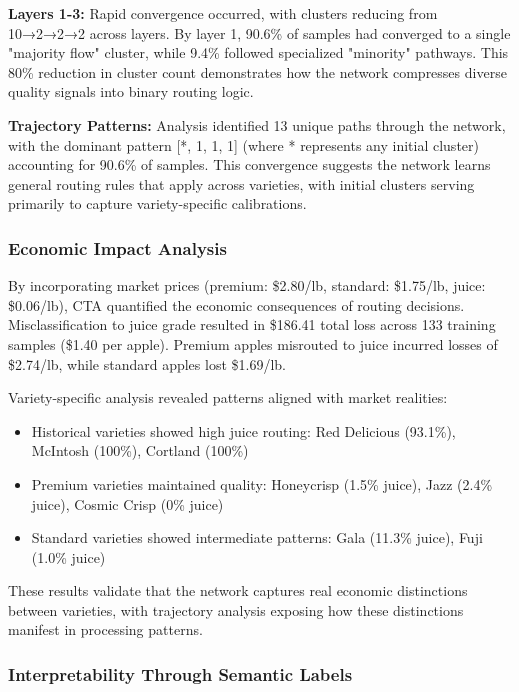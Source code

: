 \textbf{Layers 1-3:} Rapid convergence occurred, with clusters reducing from 10→2→2→2 across layers. By layer 1, 90.6\% of samples had converged to a single "majority flow" cluster, while 9.4\% followed specialized "minority" pathways. This 80\% reduction in cluster count demonstrates how the network compresses diverse quality signals into binary routing logic.

\textbf{Trajectory Patterns:} Analysis identified 13 unique paths through the network, with the dominant pattern [*, 1, 1, 1] (where * represents any initial cluster) accounting for 90.6\% of samples. This convergence suggests the network learns general routing rules that apply across varieties, with initial clusters serving primarily to capture variety-specific calibrations.

\subsubsection{Economic Impact Analysis}

By incorporating market prices (premium: \$2.80/lb, standard: \$1.75/lb, juice: \$0.06/lb), CTA quantified the economic consequences of routing decisions. Misclassification to juice grade resulted in \$186.41 total loss across 133 training samples (\$1.40 per apple). Premium apples misrouted to juice incurred losses of \$2.74/lb, while standard apples lost \$1.69/lb.

Variety-specific analysis revealed patterns aligned with market realities:
\begin{itemize}
    \item Historical varieties showed high juice routing: Red Delicious (93.1\%), McIntosh (100\%), Cortland (100\%)
    \item Premium varieties maintained quality: Honeycrisp (1.5\% juice), Jazz (2.4\% juice), Cosmic Crisp (0\% juice)
    \item Standard varieties showed intermediate patterns: Gala (11.3\% juice), Fuji (1.0\% juice)
\end{itemize}

These results validate that the network captures real economic distinctions between varieties, with trajectory analysis exposing how these distinctions manifest in processing patterns.

\subsubsection{Interpretability Through Semantic Labels}

